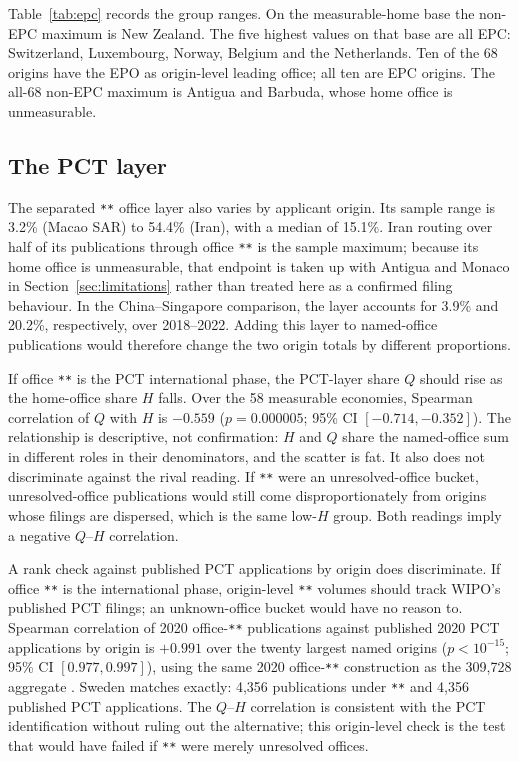 \documentclass[a4paper,fleqn]{cas-dc}
\begin{document}
Table~\ref{tab:epc} records the group ranges. On the measurable-home base
the non-EPC maximum is New Zealand. The five highest values on that base are all
EPC: Switzerland, Luxembourg, Norway, Belgium and the Netherlands. Ten of the
68 origins have the EPO as origin-level leading office; all ten are EPC
origins. The all-68 non-EPC maximum is Antigua and Barbuda, whose home office
is unmeasurable.

\subsection{The PCT layer}\label{sec:pct-result}

The separated \texttt{**} office layer also varies by applicant origin.
Its sample range is 3.2\% (Macao SAR) to 54.4\% (Iran), with a median of
15.1\%. Iran routing over half of its publications through office
\texttt{**} is the sample maximum; because its home office is unmeasurable,
that endpoint is taken up with Antigua and Monaco in
Section~\ref{sec:limitations} rather than treated here as a confirmed filing
behaviour. In the China--Singapore comparison, the layer accounts for 3.9\%
and 20.2\%, respectively, over 2018--2022. Adding this layer to named-office
publications would therefore change the two origin totals by different
proportions.

If office \texttt{**} is the PCT international phase, the PCT-layer share
$Q$ should rise as the home-office share $H$ falls. Over the 58 measurable
economies, Spearman correlation of $Q$ with $H$ is $-0.559$ ($p=0.000005$;
95\% CI $[-0.714, -0.352]$). The relationship is descriptive, not
confirmation: $H$ and $Q$ share the named-office sum in different roles in
their denominators, and the scatter is fat. It also does not discriminate
against the rival reading. If \texttt{**} were an unresolved-office bucket,
unresolved-office publications would still come disproportionately from
origins whose filings are dispersed, which is the same low-$H$ group. Both
readings imply a negative $Q$--$H$ correlation.

A rank check against published PCT applications by origin does discriminate.
If office \texttt{**} is the international phase, origin-level \texttt{**}
volumes should track WIPO's published PCT filings; an unknown-office bucket
would have no reason to. Spearman correlation of 2020 office-\texttt{**}
publications against published 2020 PCT applications by origin is $+0.991$
over the twenty largest named origins ($p<10^{-15}$; 95\% CI $[0.977,
0.997]$), using the same 2020 office-\texttt{**} construction as the 309,728
aggregate \citep{wipo2021pct}. Sweden matches exactly: 4,356 publications
under \texttt{**} and 4,356 published PCT applications. The $Q$--$H$
correlation is consistent with the PCT identification without ruling out the
alternative; this origin-level check is the test that would have failed if
\texttt{**} were merely unresolved offices.
\end{document}
